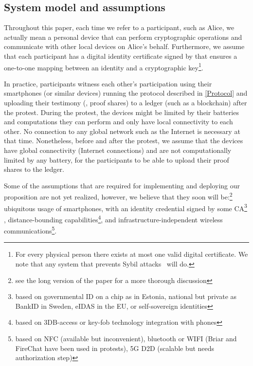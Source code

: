 \subsection{System model and assumptions}%
\label{assumptions}

Throughout this paper, each time we refer to a participant, such as Alice, we 
actually mean a personal device that can perform cryptographic operations and 
communicate with other local devices on Alice's behalf.
Furthermore, we assume that each participant has a digital identity certificate signed 
by  that ensures a one-to-one mapping between an identity and
a cryptographic key\footnote{%
  For every physical person there exists at most one valid digital
  certificate. 
  We note that any system that prevents Sybil attacks~\cite{SybilAttack} will 
  do. 
}.

In practice, participants witness each other's participation using
their smartphones (or similar devices) running the protocol described
in \cref{Protocol} and uploading their testimony (\ie, proof shares)
to a ledger (such as a blockchain) after the protest.  During the
protest, the devices might be limited by their batteries and
computations they can perform and only have local connectivity to each
other.  No connection to any global network such as the Internet is
necessary at that time.  Nonetheless, before and after the protest, we
assume that the devices have global connectivity (\ie Internet
connections) and are not computationally limited by any battery, for
the participants to be able to upload their proof shares to the
ledger.

Some of the assumptions that are required for implementing and deploying our proposition are 
not yet realized, however, we believe that they soon will
be:\footnote{see the long version of the paper for a more thorough discussion}
ubiquitous usage of smartphones, with an identity credential
signed by some \ac{CA}\footnote{based on \eg governmental ID on a chip as in Estonia, national
  but private as BankID in Sweden, eIDAS in the EU, or self-sovereign
  identities} ,  distance-bounding capabilities\footnote{based on \eg
  3DB-access or key-fob technology integration with phones}, and
infrastructure-independent wireless communications\footnote{based on
  \eg NFC (available but inconvenient), bluetooth or WIFI (Briar and
  FireChat have been used in protests), 5G D2D (scalable but needs
  authorization step)}. 


